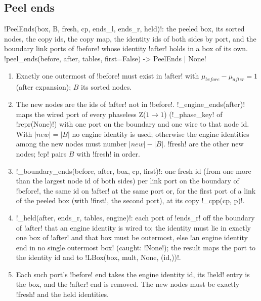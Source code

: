 {{{\subsection{Peel ends}\label{sec:lean-export-peel-ends}

\begin{signature}
\lexpy!PeelEnds(box, B, fresh, cp, ends_l, ends_r, held)!: the peeled box, its sorted nodes, the copy
ids, the copy map, the identity ids of both sides by port, and the boundary link ports of
\lexcode!before! whose identity \lexcode!after! holds in a box of its own.\\
\lexpy!peel_ends(before, after, tables, first=False) -> PeelEnds | None!
\end{signature}
\begin{algorithm}\label{alg:lean-export-peel-ends}
\begin{enumerate}
\item Exactly one outermost \bbox of \lexcode!before! must exist in \lexcode!after! with
$\mu_{\mathit{before}} - \mu_{\mathit{after}} = 1$ (after expansion); $B$ its sorted nodes.
\item The new nodes are the ids of \lexcode!after! not in \lexcode!before!. \lexpy!_engine_ends(after)!
maps the wired port of every phaseless Z($1\to1$) (\lexpy!_phase_key! of \lexpy!repr(None)!) with one
port on the boundary and one wire to that node id. With $|\mathit{new}| = |B|$ no engine
identity is used; otherwise the engine identities among the new nodes must number
$|\mathit{new}| - |B|$. \lexcode!fresh! are the other new nodes; \lexcode!cp! pairs $B$ with
\lexcode!fresh! in order.
\item \lexpy!_boundary_ends(before, after, box, cp, first)!: one fresh id (from one more than the
largest node id of both sides) per link port on the boundary of \lexcode!before!, the same id on
\lexcode!after! at the same port or, for the first port of a link of the peeled box (with
\lexcode!first!, the second port), at its copy \lexpy!_cpp(cp, p)!.
\item \lexpy!_held(after, ends_r, tables, engine)!: each port of \lexcode!ends_r! off the boundary of
\lexcode!after! that an engine identity is wired to; the identity must lie in exactly one box of
\lexcode!after! and that box must be outermost, else \lexcode!an engine identity end in no single outermost box!
(caught: \lexpy!None!); the result maps the port to the identity id and to
\lexpy!LBox(box, mult, None, (id,))!.
\item Each such port's \lexcode!before! end takes the engine identity id, its \lexcode!held! entry is the
box, and the \lexcode!after! end is removed. The new nodes must be exactly \lexcode!fresh! and the held
identities.
\end{enumerate}
\end{algorithm}

}}}
